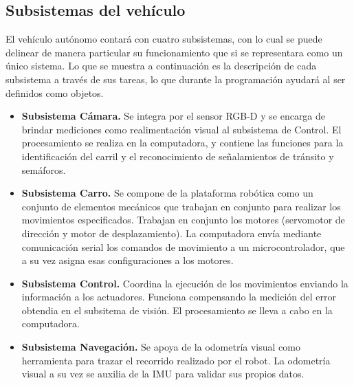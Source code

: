 \subsection{Subsistemas del vehículo}
\label{ssec:subs}
El vehículo autónomo contará con cuatro subsistemas, con lo cual se puede delinear de manera particular su funcionamiento que si se representara como un único sistema. Lo que se muestra a continuación es la descripción de cada subsistema a través de sus tareas, lo que durante la programación ayudará al ser definidos como objetos.
\begin{itemize}
	\item {\bf Subsistema Cámara.} Se integra por el sensor RGB-D y se encarga de brindar mediciones como realimentación visual al subsistema de Control. El procesamiento se realiza en la computadora, y contiene las funciones para la identificación del carril y el reconocimiento de señalamientos de tránsito y semáforos.
	\item {\bf Subsistema Carro.} Se compone de la plataforma robótica como un conjunto de elementos mecánicos que trabajan en conjunto para realizar los movimientos especificados. Trabajan en conjunto los motores (servomotor de dirección y motor de desplazamiento). La computadora envía mediante comunicación serial los comandos de movimiento a un microcontrolador, que a su vez asigna esas configuraciones a los motores.
	\item {\bf Subsistema Control.} Coordina la ejecución de los movimientos enviando la información a los actuadores. Funciona compensando la medición del error obtendia en el subsitema de visión. El procesamiento se lleva a cabo en la computadora.
	\item {\bf Subsistema Navegación.} Se apoya de la odometría visual como herramienta para trazar el recorrido realizado por el robot. La odometría visual a su vez se auxilia de la IMU para validar sus propios datos.
\end{itemize}
